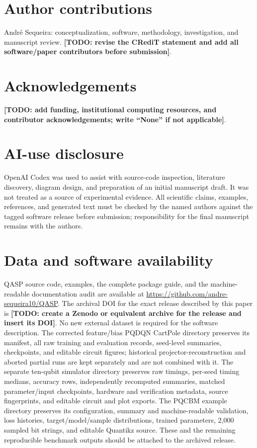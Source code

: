 \documentclass[10pt]{article}
\newcommand{\todo}[1]{\textcolor{red!75!black}{\textbf{[TODO: #1]}}}
\newcommand{\repo}{\url{https://github.com/andre-sequeira10/QASP}}
\begin{document}
\section*{Author contributions}

Andr\'{e} Sequeira: conceptualization, software, methodology, investigation, and manuscript review.  \todo{revise the CRediT statement and add all software/paper contributors before submission}.

\section*{Acknowledgements}

\todo{add funding, institutional computing resources, and contributor acknowledgements; write ``None'' if not applicable}.

\section*{AI-use disclosure}

OpenAI Codex was used to assist with source-code inspection, literature discovery, diagram design, and preparation of an initial manuscript draft.  It was not treated as a source of experimental evidence.  All scientific claims, examples, references, and generated text must be checked by the named authors against the tagged software release before submission; responsibility for the final manuscript remains with the authors.

\section*{Data and software availability}

QASP source code, examples, the complete package guide, and the machine-readable
documentation audit are available at \repo{}.  The archival DOI for the exact
release described by this paper is \todo{create a Zenodo or equivalent archive for the release and insert its DOI}.  No new external dataset is required for the software description.  The corrected feature/bias PQDQN CartPole directory preserves its manifest, all raw training and evaluation records, seed-level summaries, checkpoints, and editable circuit figures; historical projector-reconstruction and aborted partial runs are kept separately and are not combined with it.  The separate ten-qubit simulator directory preserves raw timings, per-seed timing medians, accuracy rows, independently recomputed summaries, matched parameter/input checkpoints, hardware and verification metadata, source fingerprints, and editable circuit and plot exports.  The PQCBM example directory preserves its configuration, summary and
machine-readable validation, loss histories, target/model/sample
distributions, trained parameters, 2,000 sampled bit strings, and editable
Quantikz source.  These and the remaining reproducible benchmark outputs
should be attached to the archived release.
\end{document}
